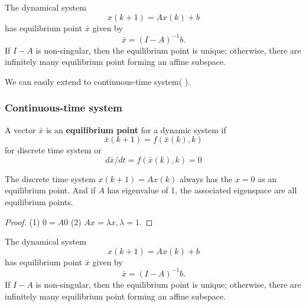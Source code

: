 \begin{refsection}
\begin{corollary}
\cite[151]{luenberger1979introduction}
The dynamical system
$$x(k+1) = Ax(k) + b$$
has equilibrium point $\bar{x}$ given by
$$\bar{x} = (I-A)^{-1}b.$$
If $I-A$ is non-singular, then the equilibrium point is unique; otherwise, there are infinitely many equilibrium point forming an affine subspace.
\end{corollary}

\begin{remark}
We can easily extend to continuous-time system(	\cite[151]{luenberger1979introduction}).
\end{remark}

\subsubsection{Continuous-time system}
\begin{definition}
	A vector $\bar{x}$ is an \textbf{equilibrium point} for a dynamic system if
	$$\bar{x}(k+1) = f(\bar{x}(k),k)$$
	for discrete time system or
	$$d\bar{x}/dt = f(\bar{x}(k),k) = 0$$
\end{definition}

\begin{lemma}
	\cite[151]{luenberger1979introduction}
	The discrete time system $x(k+1)=Ax(k)$ always has the $x=0$ as an equilibrium point. And if $A$ has eigenvalue of 1, the associated eigenspace are all equilibrium points. 
\end{lemma}
\begin{proof}
	(1) $0 = A0$ (2) $Ax = \lambda x,\lambda = 1$.	
\end{proof}


\begin{corollary}
	\cite[151]{luenberger1979introduction}
	The dynamical system
	$$x(k+1) = Ax(k) + b$$
	has equilibrium point $\bar{x}$ given by
	$$\bar{x} = (I-A)^{-1}b.$$
	If $I-A$ is non-singular, then the equilibrium point is unique; otherwise, there are infinitely many equilibrium point forming an affine subspace.
\end{corollary}





\end{refsection}

